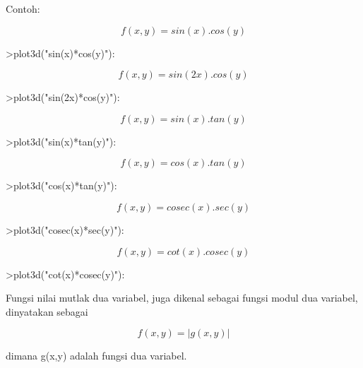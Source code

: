 \documentclass[a4paper,10pt]{article}
\begin{document}
\begin{eulernotebook}
\begin{eulercomment}
\begin{eulercomment}
\begin{eulercomment}
Contoh:\\
\end{eulercomment}
\begin{eulerformula}
\[
f(x,y)=sin(x).cos(y)
\]
\end{eulerformula}
\begin{eulerprompt}
>plot3d("sin(x)*cos(y)"):
\end{eulerprompt}
\begin{eulerformula}
\[
f(x,y)=sin(2x).cos(y)
\]
\end{eulerformula}
\begin{eulerprompt}
>plot3d("sin(2x)*cos(y)"):
\end{eulerprompt}
\begin{eulerformula}
\[
f(x,y)=sin(x).tan(y)
\]
\end{eulerformula}
\begin{eulerprompt}
>plot3d("sin(x)*tan(y)"):
\end{eulerprompt}
\begin{eulerformula}
\[
f(x,y)=cos(x).tan(y)
\]
\end{eulerformula}
\begin{eulerprompt}
>plot3d("cos(x)*tan(y)"):
\end{eulerprompt}
\begin{eulerformula}
\[
f(x,y)=cosec(x).sec(y)
\]
\end{eulerformula}
\begin{eulerprompt}
>plot3d("cosec(x)*sec(y)"):
\end{eulerprompt}
\begin{eulerformula}
\[
f(x,y)=cot(x).cosec(y)
\]
\end{eulerformula}
\begin{eulerprompt}
>plot3d("cot(x)*cosec(y)"):
\end{eulerprompt}
\begin{eulercomment}
Fungsi nilai mutlak dua variabel, juga dikenal sebagai fungsi modul
dua variabel, dinyatakan sebagai\\
\end{eulercomment}
\begin{eulerformula}
\[
f(x,y)=|g(x,y)|
\]
\end{eulerformula}
\begin{eulercomment}
dimana g(x,y) adalah fungsi dua variabel.


\end{eulercomment}
\end{eulercomment}
\end{eulercomment}
\end{eulernotebook}
\end{document}
